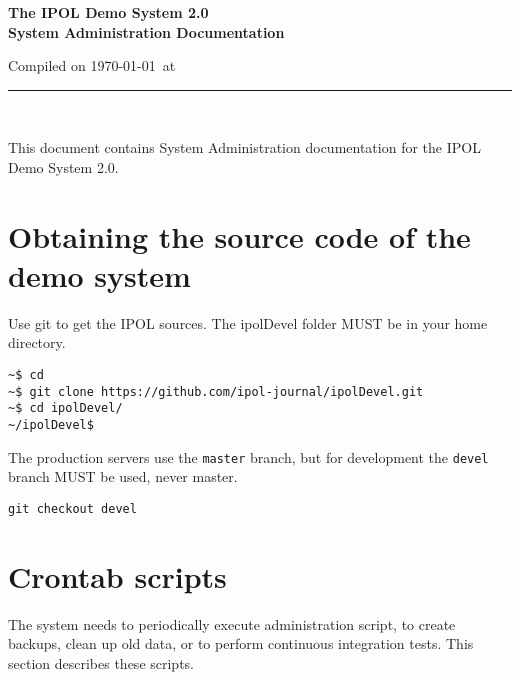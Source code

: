 \documentclass[a4paper,12pt]{article}
\begin{document}
\begin{titlepage}

\begin{center}
\vspace*{-1in}

\vspace*{0.6in}
\begin{Large}
\textbf{The IPOL Demo System 2.0 \\System Administration Documentation} \\
\end{Large}

\vspace*{0.6in}

\small{Compiled on \today\ at \currenttime}

\vspace*{0.6in}
\rule{80mm}{0.1mm}\\
\vspace*{0.1in}
\end{center}

\end{titlepage}

This document contains System Administration documentation for the IPOL Demo System 2.0.
\vspace*{0.6in}


\newpage

\tableofcontents
\newpage

\section{Obtaining the source code of the demo system}
Use git to get the IPOL sources. The ipolDevel folder MUST be in your home directory.
\begin{verbatim}
~$ cd
~$ git clone https://github.com/ipol-journal/ipolDevel.git
~$ cd ipolDevel/
~/ipolDevel$
\end{verbatim}

The production servers use the {\tt master} branch, but for development the {\tt devel} branch MUST be used, never master.
\begin{verbatim}
git checkout devel
\end{verbatim}


\section{Crontab scripts}
The system needs to periodically execute administration script, to create backups, clean up old data, or to perform continuous integration tests. This section describes these scripts.
\end{document}
